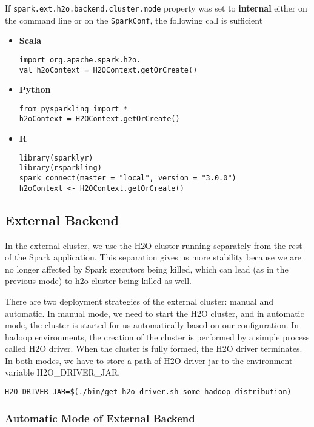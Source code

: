 If \texttt{spark.ext.h2o.backend.cluster.mode} property was set to \textbf{internal} either on the command line or
on the \texttt{SparkConf}, the following call is sufficient

\begin{itemize}
    \item \textbf{Scala} \begin{lstlisting}[style=Scala]
import org.apache.spark.h2o._
val h2oContext = H2OContext.getOrCreate()
    \end{lstlisting}
    \item \textbf{Python} \begin{lstlisting}[style=Python]
from pysparkling import *
h2oContext = H2OContext.getOrCreate()
    \end{lstlisting}
    \item \textbf{R} \begin{lstlisting}[style=R]
library(sparklyr)
library(rsparkling)
spark_connect(master = "local", version = "3.0.0")
h2oContext <- H2OContext.getOrCreate()
    \end{lstlisting}
\end{itemize}

\subsection{External Backend}

In the external cluster, we use the H2O cluster running separately from the rest of the Spark application. This separation
gives us more stability because we are no longer affected by Spark executors being killed, which can
lead (as in the previous mode) to h2o cluster being killed as well.

There are two deployment strategies of the external cluster: manual and automatic. In manual mode, we need to start
the H2O cluster, and in automatic mode, the cluster is started for us automatically based on our configuration.
In hadoop environments, the creation of the cluster is performed by a simple process called H2O driver.
When the cluster is fully formed, the H2O driver terminates. In both modes, we have to store a path of H2O driver jar
to the environment variable H2O\_DRIVER\_JAR.

\begin{lstlisting}[style=bash]
H2O_DRIVER_JAR=$(./bin/get-h2o-driver.sh some_hadoop_distribution)
\end{lstlisting}

\subsubsection{Automatic Mode of External Backend}


